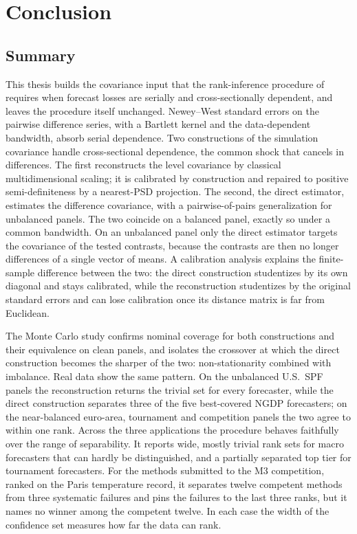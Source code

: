 \chapter{Conclusion}
\label{ch:conclusion}

\section{Summary}
\label{sec:concl-summary}

This thesis builds the covariance input that the rank-inference procedure of
\citet{mogstad2024} requires when forecast losses are serially and cross-sectionally
dependent, and leaves the procedure itself unchanged. Newey--West standard errors on the
pairwise difference series, with a Bartlett kernel and the \citet{andrews1991}
data-dependent bandwidth, absorb serial dependence. Two constructions of the simulation
covariance handle cross-sectional dependence, the common shock that cancels in
differences. The first reconstructs the level covariance by classical multidimensional
scaling; it is calibrated by construction and repaired to positive semi-definiteness by
a nearest-PSD projection. The second, the direct estimator, estimates the difference
covariance, with a pairwise-of-pairs generalization for unbalanced panels. The two
coincide on a balanced panel, exactly so under a common bandwidth. On an unbalanced panel
only the direct estimator targets the covariance of the tested contrasts, because the
contrasts are then no longer differences of a single vector of means. A calibration
analysis explains the finite-sample difference between the two: the direct construction
studentizes by its own diagonal and stays calibrated, while the reconstruction
studentizes by the original standard errors and can lose calibration once its distance
matrix is far from Euclidean.

The Monte Carlo study confirms nominal coverage for both constructions and their
equivalence on clean panels, and isolates the crossover at which the direct construction
becomes the sharper of the two: non-stationarity combined with imbalance. Real data show
the same pattern. On the unbalanced U.S.\ SPF panels the reconstruction returns the
trivial set for every forecaster, while the direct construction separates three of the
five best-covered NGDP forecasters; on the near-balanced euro-area, tournament and
competition panels the two agree to within one rank. Across the three applications the
procedure behaves faithfully over the range of separability. It reports wide, mostly
trivial rank sets for macro forecasters that can hardly be distinguished, and a
partially separated top tier for tournament forecasters. For the methods submitted to
the M3 competition, ranked on the Paris temperature record, it separates twelve
competent methods from three systematic failures and pins the failures to the last three
ranks, but it names no winner among the competent twelve. In each case the width of the
confidence set measures how far the data can rank.

